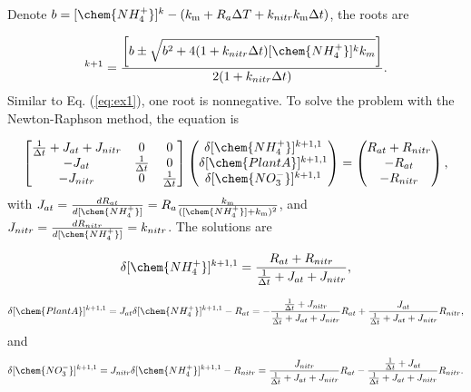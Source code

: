 \documentclass[gmd, manuscript]{copernicus}
\begin{document}
Denote $b=[\chem{NH_4^+}]^k - (k_\text{m}+R_a\Delta T + k_{nitr} k_\text{m} \Delta t)$, the roots are

\begin{equation}
[\chem{NH_4^+}]^{k+1}=\frac{\left[b \pm \sqrt{b^2+4(1+k_{nitr} \Delta
t)[\chem{NH_4^+}]^k k_m}\right]}{2(1 + k_{nitr} \Delta t)}.
\end{equation}
Similar to Eq. (\ref{eq:ex1}), one root is nonnegative. To solve the problem
with the Newton-Raphson method, the equation is

\begin{equation}
\left[
\begin{matrix}
\frac{1}{\Delta t} + J_{at} + J_{nitr} & 0 & 0 \\
-J_{at} & \frac{1}{\Delta t} & 0 \\
-J_{nitr} & 0 & \frac{1}{\Delta t} \\
\end{matrix}
\right]
\left(
\begin{matrix}
\delta [\chem{NH_4^+}]^{k+1,1} \\
\delta [\chem{PlantA}]^{k+1,1} \\
\delta [\chem{NO_3^-}]^{k+1,1} 
\end{matrix}
\right)
=
\left(
\begin{matrix}
R_{at} + R_{nitr} \\
-R_{at} \\
-R_{nitr} 
\end{matrix}
\right),
\end{equation}
with $J_{at} = \frac{dR_{at}}{d[\chem{NH_4^+}]} =
R_a\frac{k_\text{m}}{([\chem{NH_4^+}] + k_\text{m})^2}$, and $J_{nitr} =
\frac{dR_{nitr}}{d[\chem{NH_4^+}]}=k_{nitr}$. The solutions are

\begin{equation}
\delta [\chem{NH_4^+}]^{k+1,1} = \frac{R_{at} + R_{nitr}}{\frac{1}{\Delta t} +
J_{at} + J_{nitr}},
\end{equation}

\begin{equation}
\delta [\chem{PlantA}]^{k+1,1} = J_{at} \delta [\chem{NH_4^+}]^{k+1,1} - R_{at}
= -\frac{\frac{1}{\Delta t} + J_{nitr}}{\frac{1}{\Delta t} + J_{at} + J_{nitr}}
R_{at} + \frac{J_{at} }{\frac{1}{\Delta t} + J_{at} + J_{nitr}} R_{nitr},
\end{equation}
and
\begin{equation}
\delta [\chem{NO_3^-}]^{k+1,1} = J_{nitr} \delta [\chem{NH_4^+}]^{k+1,1} -
R_{nitr} = \frac{J_{nitr}}{\frac{1}{\Delta t} + J_{at} + J_{nitr}} R_{at} -
\frac{\frac{1}{\Delta t} + J_{at} }{\frac{1}{\Delta t} + J_{at} + J_{nitr}}
R_{nitr}.
\end{equation}
\end{document}

